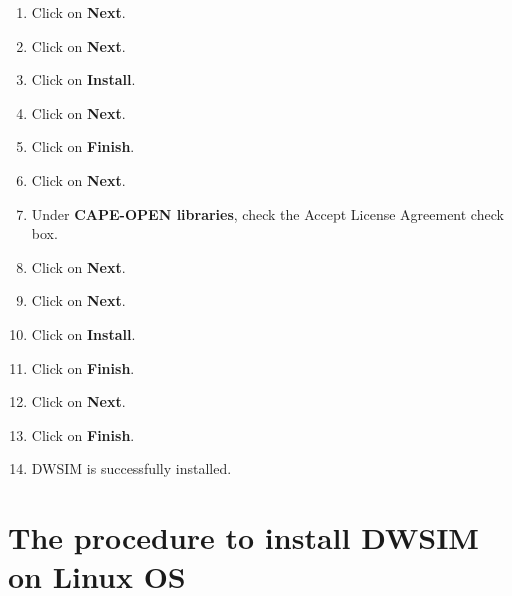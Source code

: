 \documentclass[a4paper,12pt]{article}
\begin{document}
\begin{enumerate}
\item Click on \textbf{Next}.
\item Click on \textbf{Next}.
\item Click on \textbf{Install}.
\item Click on \textbf{Next}.
\item Click on \textbf{Finish}.
\item Click on \textbf{Next}.
\item Under \textbf{CAPE-OPEN libraries}, check the Accept License Agreement check box.
\item Click on \textbf{Next}.
\item Click on \textbf{Next}.
\item Click on \textbf{Install}.
\item Click on \textbf{Finish}.
\item Click on \textbf{Next}.
\item Click on \textbf{Finish}.
\item DWSIM is successfully installed.

\end{enumerate}

\section{The procedure to install DWSIM on Linux OS}
\end{document}
